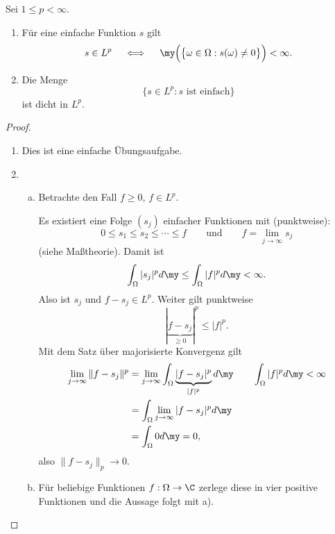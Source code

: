 \begin{st} \label{2.15}
	Sei $1 \le p < \infty$.
	\begin{enumerate}[1)]
		\item
			Für eine einfache Funktion $s$ gilt
			\[
				s \in L^p
				\quad \iff \quad
				\my\Big( \big\{ \omega \in \Omega : s(\omega) \neq 0 \big\} \Big) < \infty.
			\]
		\item
			Die Menge
			\[
				\Big\{ s \in L^p : s \text{ ist einfach} \Big\}
			\]
			ist dicht in $L^p$.
	\end{enumerate}
	\begin{proof}
		\begin{enumerate}[1)]
			\item
				Dies ist eine einfache Übungsaufgabe.
			\item
				\begin{enumerate}[a)]
					\item
						Betrachte den Fall $f \ge 0$, $f \in L^p$.

						Es existiert eine Folge $(s_j)$ einfacher Funktionen mit (punktweise):
						\[
							0 \le s_1 \le s_2 \le \dotsb \le f
							\qquad \text{und} \qquad
							f = \lim_{j\to \infty} s_j
						\]
						(siehe Maßtheorie).
						Damit ist
						\[
							\int_{\Omega} |s_j|^p d\my
							\le \int_{\Omega} |f|^p d\my
							< \infty.
						\]
						Also ist $s_j$ und $f-s_j \in L^p$.
						Weiter gilt punktweise
						\[
							|\underbrace{f - s_j}_{\ge 0}|^p \le |f|^p.
						\]
						Mit dem Satz über majorisierte Konvergenz gilt
						\begin{align*}
							\lim_{j\to \infty} \|f - s_j\|^p
							&= \lim_{j\to \infty} \int_{\Omega} \underbrace{|f-s_j|^p}_{|f|^p} d\my  \qquad \int_{\Omega} |f|^p d\my < \infty\\
							&= \int_{\Omega} \lim_{j\to \infty} |f- s_j |^p d\my \\
							&= \int_{\Omega} 0 d\my
							= 0,
						\end{align*}
						also $\|f-s_j\|_p \to 0$.
					\item
						Für beliebige Funktionen $f: \Omega \to \C$ zerlege diese in vier positive Funktionen und die Aussage folgt mit a).
				\end{enumerate}
		\end{enumerate}
	\end{proof}
\end{st}

